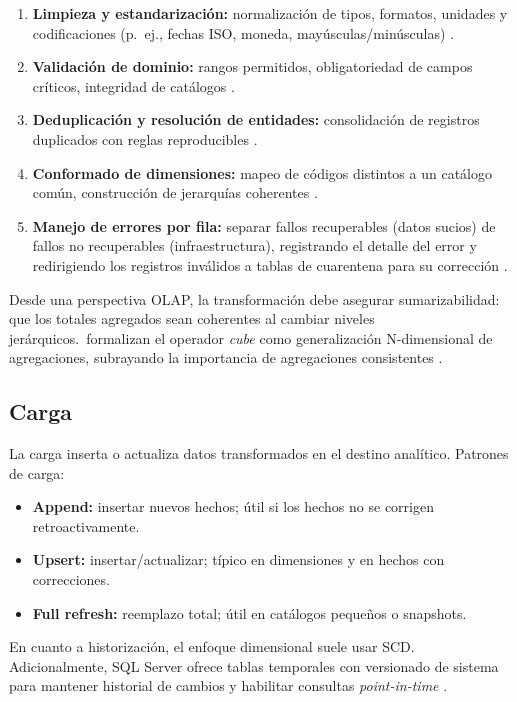 \documentclass[12pt]{article}
\begin{document}
\begin{enumerate}[label=\textbf{T\arabic*.}, leftmargin=*]
\item \textbf{Limpieza y estandarización:} normalización de tipos, formatos, unidades y codificaciones (p.\ ej., fechas ISO, moneda, mayúsculas/minúsculas) \cite{kimball_etl_toolkit}.
\item \textbf{Validación de dominio:} rangos permitidos, obligatoriedad de campos críticos, integridad de catálogos \cite{kimball_etl_toolkit}.
\item \textbf{Deduplicación y resolución de entidades:} consolidación de registros duplicados con reglas reproducibles \cite{kimball_etl_toolkit}.
\item \textbf{Conformado de dimensiones:} mapeo de códigos distintos a un catálogo común, construcción de jerarquías coherentes \cite{kimball_etl_toolkit}.
\item \textbf{Manejo de errores por fila:} separar fallos recuperables (datos sucios) de fallos no recuperables (infraestructura), registrando el detalle del error y redirigiendo los registros inválidos a tablas de cuarentena para su corrección \cite{kimball_etl_toolkit}.
\end{enumerate}

Desde una perspectiva OLAP, la transformación debe asegurar sumarizabilidad: que los totales agregados sean coherentes al cambiar niveles jerárquicos.\ formalizan el operador \textit{cube} como generalización N-dimensional de agregaciones, subrayando la importancia de agregaciones consistentes \cite{gray_cube}.

\subsection{Carga}
La carga inserta o actualiza datos transformados en el destino analítico. Patrones de carga:

\begin{itemize}[leftmargin=*]
\item \textbf{Append:} insertar nuevos hechos; útil si los hechos no se corrigen retroactivamente.
\item \textbf{Upsert:} insertar/actualizar; típico en dimensiones y en hechos con correcciones.
\item \textbf{Full refresh:} reemplazo total; útil en catálogos pequeños o snapshots.
\end{itemize}

En cuanto a historización, el enfoque dimensional suele usar SCD. Adicionalmente, SQL Server ofrece tablas temporales con versionado de sistema para mantener historial de cambios y habilitar consultas \textit{point-in-time} \cite{ms_temporal_tables}.
\end{document}
